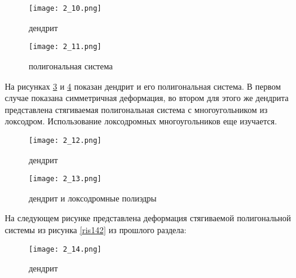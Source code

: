 \begin{figure}[h!]
\centering
\texttt{[image: 2\_10.png]}
\caption{дендрит}%
\label{ris210}%
\end{figure}

\begin{figure}[h!]
\centering
\texttt{[image: 2\_11.png]}
\caption{полигональная система}%
\label{ris211}%
\end{figure}

\newpage

На рисунках \ref{ris212} и \ref{ris213} показан дендрит и его полигональная система. В первом случае показана симметричная деформация, во втором для этого же дендрита представлена стягиваемая полигональная система с многоугольником из локсодром. Использование локсодромных многоугольников еще изучается.

\begin{figure}[h!]
\centering
\texttt{[image: 2\_12.png]}
\caption{дендрит}%
\label{ris212}%
\end{figure}

\newpage
\begin{figure}[h!]
\centering
\texttt{[image: 2\_13.png]}
\caption{дендрит и локсодромные полиэдры}%
\label{ris213}%
\end{figure}

На следующем рисунке представлена деформация стягиваемой полигональной системы из рисунка \ref{ris142} из прошлого раздела:

\newpage
\begin{figure}[h!]
\centering
\texttt{[image: 2\_14.png]}
\caption{дендрит}%
\label{ris214}%
\end{figure}